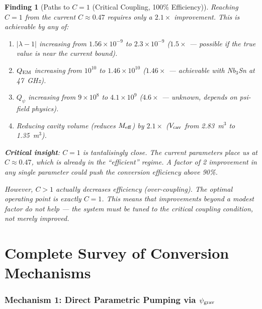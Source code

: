 \documentclass[11pt]{article}
\newtheorem{finding}{Finding}
\newcommand{\ee}[1]{\times 10^{#1}}
\newcommand{\psigrav}{\psi_{\rm grav}}
\newcommand{\Meff}{M_{\rm eff}}
\newcommand{\lambdaone}{|\lambda{-}1|}
\newcommand{\Qpsi}{Q_\psi}
\newcommand{\QEM}{Q_{\rm EM}}
\begin{document}
\begin{finding}[Paths to $C = 1$ (Critical Coupling, 100\% Efficiency)]
\label{find:paths-to-C1}
Reaching $C = 1$ from the current $C \approx 0.47$ requires only a
$2.1\times$ improvement. This is achievable by \emph{any} of:

\begin{enumerate}[nosep]
\item $\lambdaone$ increasing from $1.56\ee{-9}$ to $2.3\ee{-9}$
  ($1.5\times$ --- possible if the true value is near the current bound).
\item $\QEM$ increasing from $10^{10}$ to $1.46\ee{10}$
  ($1.46\times$ --- achievable with Nb$_3$Sn at 47~GHz).
\item $\Qpsi$ increasing from $9\ee{8}$ to $4.1\ee{9}$
  ($4.6\times$ --- unknown, depends on psi-field physics).
\item Reducing cavity volume (reduces $\Meff$) by $2.1\times$
  ($V_{\rm cav}$ from 2.83~m$^3$ to 1.35~m$^3$).
\end{enumerate}

\textbf{Critical insight}: $C = 1$ is tantalisingly close. The
current parameters place us at $C \approx 0.47$, which is already in
the ``efficient'' regime. A factor of 2 improvement in \emph{any single
parameter} could push the conversion efficiency above 90\%.

However, $C > 1$ actually \emph{decreases} efficiency (over-coupling).
The optimal operating point is exactly $C = 1$. This means that
improvements beyond a modest factor do not help --- the system must be
\emph{tuned} to the critical coupling condition, not merely improved.
\end{finding}

\part{Complete Survey of Conversion Mechanisms}
\label{part:mechanisms}

\section{Mechanism 1: Direct Parametric Pumping via $\psigrav$}
\label{sec:mech-parametric}
\end{document}
